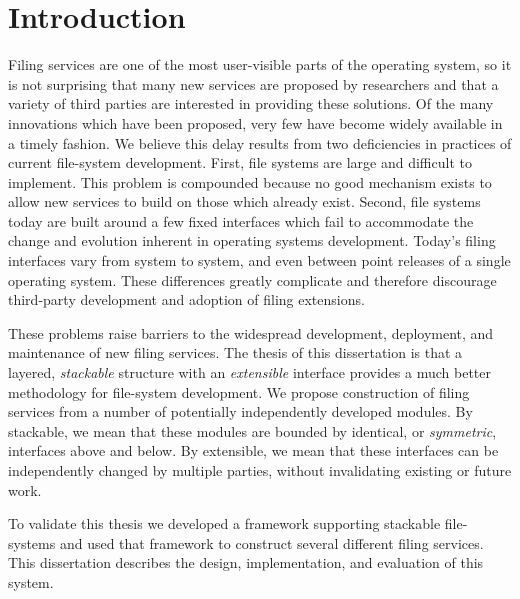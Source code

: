 
%
%

\chapter{Introduction}

\noindenthack
Filing services are one of the most user-visible
  parts of the operating system,
  so it is not surprising that 
  many new services are proposed
  by researchers
  and that a variety of third parties are interested in providing
  these solutions.
Of the many innovations which have been proposed,
  very few have become widely available
  in a timely fashion.
We believe this delay results from two deficiencies
  in practices of current file-system development.
First,
  file systems are large and difficult to implement.
This problem is compounded because
  no good mechanism exists to allow
  new services to build on those which already exist.
Second,
  file systems today are built around a few fixed interfaces
  which fail to accommodate the change and evolution inherent in
  operating systems development.
Today's filing interfaces vary from
  system to system,
  and even between point releases of a 
  single operating system.
These differences greatly complicate and therefore discourage
  third-party development and adoption of filing extensions.

These problems raise barriers to the widespread
  development, deployment, and maintenance of new filing
  services.
The thesis of this dissertation is that
  a layered,
  \emph{stackable} structure
  with an \emph{extensible} interface
  provides a much better methodology
  for file-system development.
We propose construction of filing services from a number
  of potentially independently developed modules.
By stackable,
  we mean that these modules are bounded by
  identical, or \emph{symmetric}, interfaces above and below.
By extensible, we mean that these interfaces
  can be independently changed by multiple parties,
  without invalidating existing or future work.

To validate this thesis we developed a
  framework supporting stackable file-systems
  and used that framework to construct several
  different filing services.
This dissertation describes the design,
  implementation,
  and evaluation of this system.


% 







